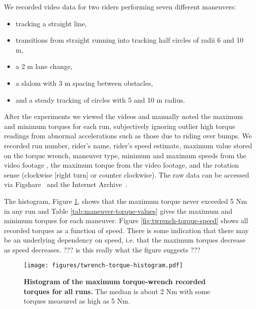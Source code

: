 \documentclass[10pt]{article}
\begin{document}
We recorded video data for two riders performing seven different maneuvers:

\begin{itemize}
  \item tracking a straight line,
  \item transitions from straight running into tracking half circles of radii 6 and 10
    m,
  \item a 2 m lane change,
  \item a slalom with 3 m spacing between obstacles,
  \item and a steady tracking of circles with 5 and 10 m radius.
\end{itemize}

After the experiments we viewed the videos and manually noted the
maximum and minimum torques for each run, subjectively ignoring outlier high
torque readings from abnormal accelerations such as those due to riding over
bumps. We recorded run number, rider's name, rider's speed estimate, maximum value stored on the torque wrench,
maneuver type, minimum and maximum speeds from the video
footage , the maximum torque from the video footage, and the
rotation sense (clockwise [right turn] or counter
clockwise). The raw data can be accessed via Figshare~\cite{}
and the Internet Archive~\cite{}.

The histogram, Figure \ref{fig:twrench-torque-histogram}, shows that the
maximum torque never exceeded 5 Nm in any run and Table
\ref{tab:maneuver-torque-values} gives the maximum and minimum torques for each
maneuver. Figure \ref{fig:twrench-torque-speed} shows all recorded
torques as a function of speed. There is some indication that there may be an
underlying dependency on speed, i.e. that the maximum torques decrease as speed
decreases.  ??? is this really what the figure suggests ???

\begin{figure}
  \centering
  \texttt{[image: figures/twrench-torque-histogram.pdf]}
  \caption{{\bf Histogram of the maximum torque-wrench recorded torques for all runs.}
    The median is about 2 Nm with some torques measured as high as 5 Nm. }
  \label{fig:twrench-torque-histogram}
\end{figure}
\end{document}
